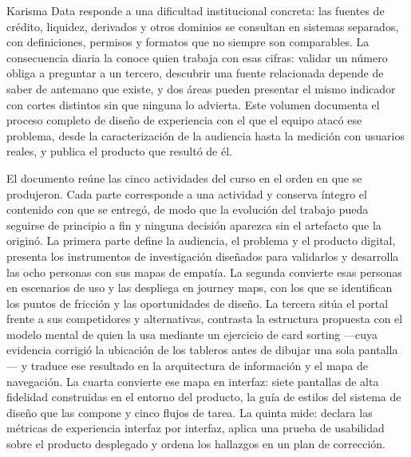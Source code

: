 \documentclass[11pt,letterpaper]{article}
\begin{document}

\tableofcontents
\clearpage

\label{cmp:intro}

Karisma Data responde a una dificultad institucional concreta: las fuentes de crédito, liquidez,
derivados y otros dominios se consultan en sistemas separados, con definiciones, permisos y
formatos que no siempre son comparables. La consecuencia diaria la conoce quien trabaja con esas
cifras: validar un número obliga a preguntar a un tercero, descubrir una fuente relacionada
depende de saber de antemano que existe, y dos áreas pueden presentar el mismo indicador con
cortes distintos sin que ninguna lo advierta. Este volumen documenta el proceso completo de diseño
de experiencia con el que el equipo atacó ese problema, desde la caracterización de la audiencia
hasta la medición con usuarios reales, y publica el producto que resultó de él.

El documento reúne las cinco actividades del curso en el orden en que se produjeron. Cada parte
corresponde a una actividad y conserva íntegro el contenido con que se entregó, de modo que la
evolución del trabajo pueda seguirse de principio a fin y ninguna decisión aparezca sin el
artefacto que la originó. La primera parte define la audiencia, el problema y el producto digital,
presenta los instrumentos de investigación diseñados para validarlos y desarrolla las ocho
personas con sus mapas de empatía. La segunda convierte esas personas en escenarios de uso y las
despliega en journey maps, con los que se identifican los puntos de fricción y las oportunidades
de diseño. La tercera sitúa el portal frente a sus competidores y alternativas, contrasta la
estructura propuesta con el modelo mental de quien la usa mediante un ejercicio de card sorting
---cuya evidencia corrigió la ubicación de los tableros antes de dibujar una sola pantalla--- y
traduce ese resultado en la arquitectura de información y el mapa de navegación. La cuarta
convierte ese mapa en interfaz: siete pantallas de alta fidelidad construidas en el entorno del
producto, la guía de estilos del sistema de diseño que las compone y cinco flujos de tarea. La
quinta mide: declara las métricas de experiencia interfaz por interfaz, aplica una prueba de
usabilidad sobre el producto desplegado y ordena los hallazgos en un plan de corrección.
\end{document}
